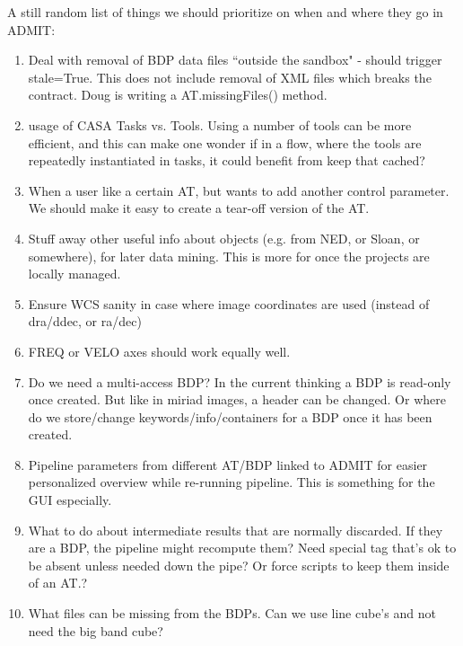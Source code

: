 \documentclass[preprint]{aastex}
\begin{document}
A still random list of things we should prioritize on when and where they go in ADMIT:

\begin{enumerate}

\item Deal with removal of BDP data files ``outside the sandbox" - should trigger stale=True.  
This does not include removal of XML files which breaks the contract.  
Doug is writing a AT.missingFiles() method.


\item
usage of CASA Tasks vs. Tools.  Using a number of tools can be more efficient,
and this can make one wonder if in a flow, where the tools are repeatedly
instantiated in tasks, it could benefit from keep that cached?

\item
When a user like a certain AT, but wants to add another control parameter.
We should make it easy to create a tear-off version of the AT.

\item
Stuff away other useful info about objects (e.g. from NED, or Sloan,
or somewhere), for later data mining. This is more for once the projects
are locally managed.

\item
Ensure WCS sanity in case where image coordinates are used (instead of
dra/ddec, or ra/dec)

\item
FREQ or VELO axes should work equally well.

\item
Do we need a multi-access BDP?  In the current thinking a BDP is read-only
once created.  But like in miriad images, a header can be changed.
Or where do we store/change keywords/info/containers for a BDP once it
has been created.

\item
Pipeline parameters from different AT/BDP linked to ADMIT for easier
personalized overview while re-running pipeline. This is something for
the GUI especially.

\item
What to do about intermediate results that are normally discarded. If they
are a BDP, the pipeline might recompute them?  Need special tag that's
ok to be absent unless needed down the pipe?  Or force scripts to keep
them inside of an AT.?

\item
What files can be missing from the BDPs. Can we use line cube's and not
need the big band cube?


\end{enumerate}
\end{document}
